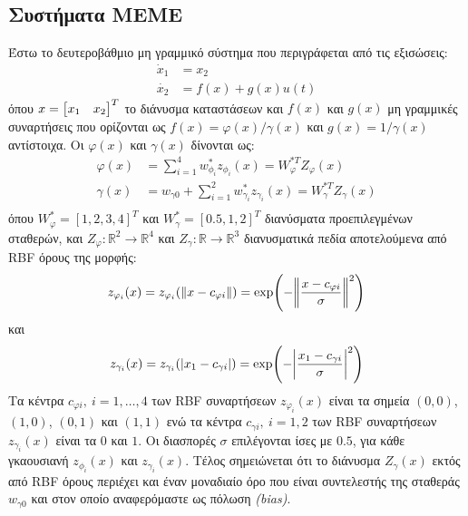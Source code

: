 \subsection{Συστήματα ΜΕΜΕ}
\label{subsec:rbf_siso}
Έστω το δευτεροβάθμιο μη γραμμικό σύστημα που περιγράφεται από τις εξισώσεις:
\begin{equation*}
\begin{split}
\dot{x}_1 &= x_2 \\
\dot{x_2} &= f(x) + g(x) u(t)
\end{split}
\end{equation*}
όπου $x = \bmqty{x_1 & x_2}^T$ το διάνυσμα καταστάσεων και $f(x)$ και $g(x)$ μη γραμμικές συναρτήσεις που ορίζονται ως $f(x) = \varphi(x)/\gamma(x)$ και $g(x) = 1/\gamma(x)$ αντίστοιχα. Οι  $\varphi(x)$ και $\gamma(x)$ δίνονται ως:
\begin{equation*}
\begin{split}
	\varphi(x)  &= \sum_{i = 1}^{4} w_{\phi_i}^* z_{\phi_i} (x) = W_{\varphi}^{*T} Z_\varphi(x) \\
	\gamma(x)  &= w_{\gamma 0} + \sum_{i = 1}^{2} w_{\gamma_i}^* z_{\gamma_i} (x) = W_{\gamma}^{*T} Z_\gamma(x) \\
	\end{split}
\end{equation*}
όπου $W_{\varphi}^* = [1,2,3,4]^T$ και $W_{\gamma}^* = [0.5,1,2]^T$ διανύσματα προεπιλεγμένων σταθερών, και $Z_\varphi: \mathbb{R}^2 \rightarrow \mathbb{R}^4$ και $Z_\gamma: \mathbb{R} \rightarrow \mathbb{R}^3$ διανυσματικά πεδία αποτελούμενα από RBF όρους της μορφής:
\begin{equation*}
	z_{\varphi_i}(x) = z_{\varphi_i}(\norm{x - c_{\varphi i}}) 
	= \exp( -\norm{\frac{x - c_{\varphi i}}{\sigma}}^2 )
	\label{eq:qaussian_term_phi}
\end{equation*}
και 
\begin{equation*}
z_{\gamma_i}(x) = z_{\gamma_i}(\abs{x_1 - c_{\gamma i}}) 
= \exp( -\abs{\frac{x_1 - c_{\gamma i}}{\sigma}}^2 )
\label{eq:qaussian_term_gamma}
\end{equation*}
Τα κέντρα $c_{\varphi i}, \: i = 1,\dots,4$ των RBF συναρτήσεων $z_{\varphi_i}(x)$ είναι τα σημεία $(0,0)$, $(1,0)$, $(0,1)$ και $(1,1)$ ενώ τα κέντρα $c_{\gamma i},\: i=1,2$ των RBF συναρτήσεων $z_{\gamma_i}(x)$ είναι τα $0$ και $1$. Οι διασπορές $\sigma$ επιλέγονται ίσες με $0.5$, για κάθε γκαουσιανή $z_{\phi_i}(x)$ και $z_{\gamma_i}(x)$. Τέλος σημειώνεται ότι το διάνυσμα $Z_\gamma(x)$ εκτός από RBF όρους περιέχει και έναν μοναδιαίο όρο που είναι συντελεστής της σταθεράς $w_{\gamma 0}$ και στον οποίο αναφερόμαστε ως πόλωση \textit{(bias)}.

